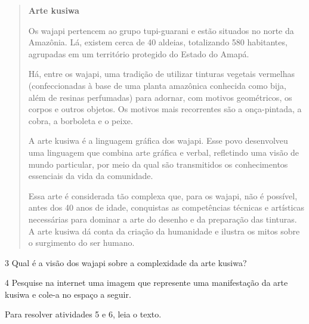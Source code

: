\begin{quote}
\textbf{Arte kusiwa}

Os wajapi pertencem ao grupo tupi-guarani e estão situados no norte da
Amazônia. Lá, existem cerca de 40 aldeias, totalizando 580 habitantes,
agrupadas em um território protegido do Estado do Amapá.

Há, entre os wajapi, uma tradição de utilizar tinturas vegetais vermelhas
(confeccionadas à base de uma planta amazônica conhecida como bija, além
de resinas perfumadas) para adornar, com motivos geométricos, os corpos e
outros objetos. Os motivos mais recorrentes são a onça-pintada, a cobra, a
borboleta e o peixe.

A arte kusiwa é a linguagem gráfica dos wajapi. Esse povo
desenvolveu uma linguagem que combina arte gráfica e verbal, refletindo uma
visão de mundo particular, por meio da qual são transmitidos os conhecimentos
essenciais da vida da comunidade.

Essa arte é considerada tão complexa que, para os wajapi, não é possível, antes
dos 40 anos de idade, conquistas as competências técnicas e artísticas necessárias
para dominar a arte do desenho e da preparação das tinturas. A arte kusiwa dá conta
da criação da humanidade e ilustra os mitos sobre o surgimento do ser humano.

\end{quote}


\num{3}  Qual é a visão dos wajapi sobre a complexidade da arte kusiwa?



\num{4}  Pesquise na internet uma imagem que represente uma manifestação da
arte kusiwa e cole-a no espaço a seguir.

\begin{mdframed}[linewidth=10pt,linecolor=salmao,roundcorner=20pt]
\vspace{4cm}
\end{mdframed}



Para resolver atividades 5 e 6, leia o texto.

